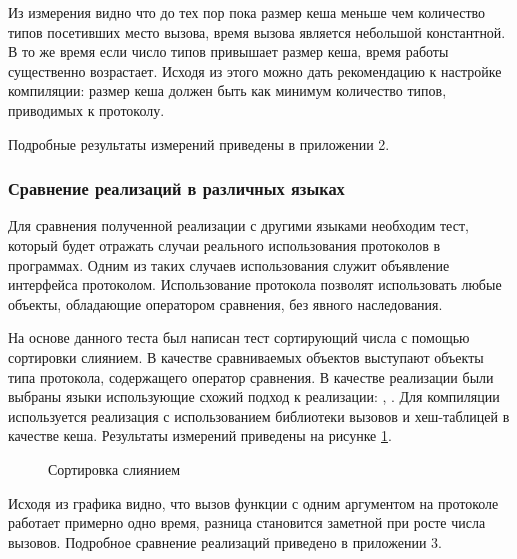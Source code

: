 Из измерения видно что до тех пор пока размер кеша меньше чем количество типов посетивших место вызова, время вызова является небольшой константной. В то же время если число типов привышает размер кеша, время работы существенно возрастает. Исходя из этого можно дать рекомендацию к настройке компиляции: размер кеша должен быть как минимум количество типов, приводимых к протоколу.

Подробные результаты измерений приведены в приложении 2.

\subsubsection{Сравнение реализаций в различных языках}
Для сравнения полученной реализации с другими языками необходим тест, который будет отражать случаи реального использования протоколов в программах. Одним из таких случаев использования служит объявление интерфейса  протоколом. Использование протокола  позволят использовать любые объекты, обладающие оператором сравнения, без явного наследования.

На основе данного теста был написан тест сортирующий числа с помощью сортировки слиянием\cite{merge_sort}. В качестве сравниваемых объектов выступают объекты типа протокола, содержащего оператор сравнения. В качестве реализации были выбраны  языки использующие схожий подход к реализации: , . Для компиляции  используется реализация с использованием библиотеки вызовов и хеш-таблицей в качестве кеша. Результаты измерений приведены на рисунке \ref{plot:bench:mergeSort}.

\begin{figure}[H]
\caption{\label{plot:bench:mergeSort} Сортировка слиянием}
\end{figure}

Исходя из графика видно, что вызов функции с одним аргументом на протоколе работает примерно одно время, разница становится заметной при росте числа вызовов. Подробное сравнение реализаций приведено в приложении 3.
